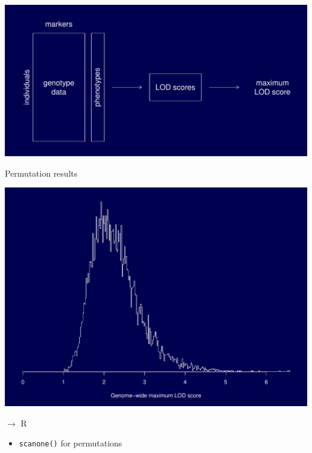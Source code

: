 \documentclass[12pt]{article}
\newcommand{\headsize}{\fontsize{35}{35} \selectfont}
\newcommand{\smallsize}{\fontsize{25}{30} \selectfont}
\begin{document}
\vspace{2cm}

\centerline{\includegraphics{Figs/permtest.pdf}}

\newpage

\headsize \color{myyellow}
\hfill \begin{minipage}{5.75in}
\centering
Permutation results
\end{minipage}

\vfill

\centerline{\includegraphics{Figs/perm_hist.pdf}}






\newpage

\headsize \color{myyellow}
$\boldsymbol{\rightarrow}$ R

\vspace{3cm}

\color{mywhite} \smallsize

\hfill \begin{minipage}[t]{9.5in}
\begin{itemize}
\itemsep24pt
\item \verb|scanone()| for permutations
\end{itemize} \end{minipage}
\end{document}
